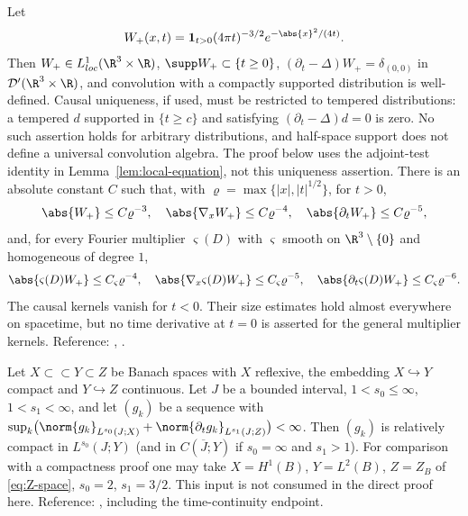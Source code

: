 \documentclass[11pt,reqno]{amsart}
\begin{document}
\begin{externalinput}\label{ext:heat-kernel}
Let
\[
W_{+}(x,t)=\mathbf{1}_{t>0}(4\pi t)^{-3/2}e^{-\abs{x}^{2}/(4t)}
.
\] Then
$W_{+}\in L^{1}_{loc}(\R^{3}\times\R)$, $\supp W_{+}\subset\{t\ge0\}$,
$(\partial_{t}-\Delta)W_{+}=\delta_{(0,0)}$ in $\mathcal{D}'(\R^{3}\times\R)$,
and convolution with a compactly supported distribution is well-defined.
Causal uniqueness, if used, must be restricted to tempered distributions:
a tempered $d$ supported in $\{t\ge c\}$ and satisfying
$(\partial_t-\Delta)d=0$ is zero. No such assertion holds for arbitrary
distributions, and half-space support does not define a universal
convolution algebra. The proof below uses the adjoint-test identity
in Lemma~\ref{lem:local-equation}, not this uniqueness assertion.
There is an absolute constant $C$
such that, with
$\varrho=\max\{|x|,|t|^{1/2}\}$, for $t>0$,
\[
  \abs{W_{+}}\le C\varrho^{-3},\quad
  \abs{\nabla_{x}W_{+}}\le C\varrho^{-4},\quad
  \abs{\partial_{t}W_{+}}\le C\varrho^{-5},
\]
and, for every Fourier multiplier $\varsigma(D)$ with $\varsigma$ smooth on
$\R^{3}\setminus\{0\}$ and homogeneous of degree $1$,
\[
  \abs{\varsigma(D)W_{+}}\le C_{\varsigma}\varrho^{-4},\quad
  \abs{\nabla_{x}\varsigma(D)W_{+}}\le C_{\varsigma}\varrho^{-5},\quad
  \abs{\partial_{t}\varsigma(D)W_{+}}\le C_{\varsigma}\varrho^{-6}.
\]
The causal kernels vanish for $t<0$. Their size estimates hold almost
everywhere on spacetime, but no time derivative at $t=0$ is asserted for
the general multiplier kernels.
Reference: \cite[\S IV.11]{LadyzhenskayaSolonnikovUraltseva1968},
\cite[Ch.~5]{LemarieRieusset2016}.
\end{externalinput}

\begin{externalinput}\label{ext:aubin-lions}
Let $X\subset\subset Y\subset Z$ be Banach spaces with $X$ reflexive, the
embedding $X\hookrightarrow Y$ compact and $Y\hookrightarrow Z$ continuous. Let
$J$ be a bounded interval, $1<s_{0}\le\infty$, $1<s_{1}<\infty$, and let
$(g_{k})$ be a sequence with
$\sup_{k}\bigl(\norm{g_{k}}_{L^{s_{0}}(J;X)}+\norm{\partial_{t}g_{k}}_{L^{s_{1}}(J;Z)}\bigr)<\infty$.
Then $(g_{k})$ is relatively compact in $L^{s_{0}}(J;Y)$ (and in $C(\overline{J};Y)$
if $s_{0}=\infty$ and $s_{1}>1$). For comparison with a compactness proof one may take
$X=H^{1}(B)$, $Y=L^{2}(B)$, $Z=Z_B$ of \eqref{eq:Z-space},
$s_0=2$, $s_1=3/2$. This input is not consumed in the direct proof here.
Reference: \cite[Corollary 4]{Simon1987}, including the time-continuity endpoint.
\end{externalinput}
\end{document}
